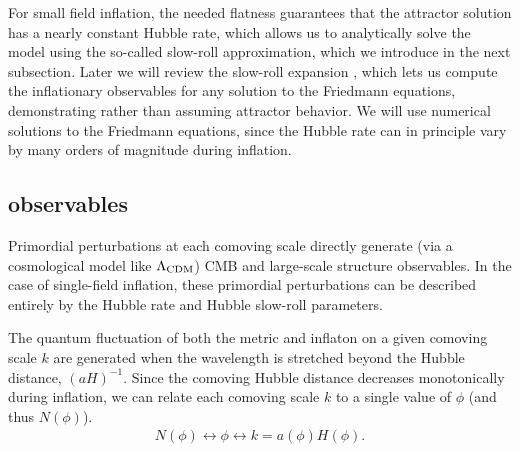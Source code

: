 \documentclass[aps,amsfonts,amsmath,prd,preprint,nofootinbib,superscriptaddress]{revtex4}
\begin{document}
For small field inflation, the needed flatness guarantees that the attractor solution has a nearly constant Hubble rate, which allows us to 
analytically solve the model using the so-called slow-roll approximation, which we introduce in the next subsection.  
Later we will review the slow-roll expansion \cite{Liddle:1994dx}, which lets us compute the inflationary observables for any solution to the Friedmann equations, 
demonstrating rather than assuming attractor behavior.  
We will use numerical solutions to the Friedmann equations, since the Hubble rate can in principle vary by many orders of magnitude during inflation.









\subsection{observables}
Primordial perturbations at each comoving scale directly 
generate (via a cosmological model like $\Lambda_{\rm CDM}$) CMB and large-scale structure observables.   In the case of single-field inflation, these primordial perturbations can 
be described entirely by the Hubble rate and Hubble slow-roll parameters.

The quantum fluctuation of both the metric and inflaton on a given comoving scale $k$ are generated when the wavelength is stretched beyond the Hubble distance, $(a H)^{-1}$.
Since the comoving Hubble distance decreases monotonically during inflation, we can relate each comoving scale $k$ to a single value of $\phi$ (and thus $N(\phi)$). 
\begin{align}
N(\phi) \longleftrightarrow \phi \longleftrightarrow k = a(\phi) H(\phi).
\end{align}  



 
\end{document}
